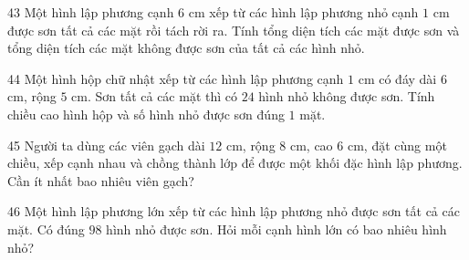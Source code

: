 \gap
\begin{probbox}{43}{}
Một hình lập phương cạnh $6$ cm xếp từ các hình lập phương nhỏ cạnh $1$ cm được sơn tất cả các mặt rồi tách rời ra. Tính tổng diện tích các mặt được sơn và tổng diện tích các mặt không được sơn của tất cả các hình nhỏ.
\end{probbox}
\gap
\begin{probbox}{44}{}
Một hình hộp chữ nhật xếp từ các hình lập phương cạnh $1$ cm có đáy dài $6$ cm, rộng $5$ cm. Sơn tất cả các mặt thì có $24$ hình nhỏ không được sơn. Tính chiều cao hình hộp và số hình nhỏ được sơn đúng $1$ mặt.
\end{probbox}
\gap
\begin{probbox}{45}{}
Người ta dùng các viên gạch dài $12$ cm, rộng $8$ cm, cao $6$ cm, đặt cùng một chiều, xếp cạnh nhau và chồng thành lớp để được một khối đặc hình lập phương. Cần ít nhất bao nhiêu viên gạch?
\end{probbox}
\gap
\begin{probbox}{46}{}
Một hình lập phương lớn xếp từ các hình lập phương nhỏ được sơn tất cả các mặt. Có đúng $98$ hình nhỏ được sơn. Hỏi mỗi cạnh hình lớn có bao nhiêu hình nhỏ?
\end{probbox}
